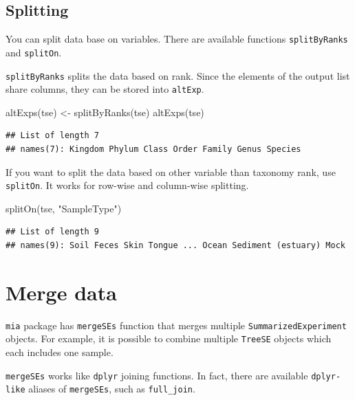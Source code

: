 \documentclass[
]{book}
\newenvironment{Shaded}{\begin{snugshade}}{\end{snugshade}}
\newcommand{\FunctionTok}[1]{\textcolor[rgb]{0.00,0.00,0.00}{#1}}
\newcommand{\NormalTok}[1]{#1}
\newcommand{\OtherTok}[1]{\textcolor[rgb]{0.56,0.35,0.01}{#1}}
\newcommand{\StringTok}[1]{\textcolor[rgb]{0.31,0.60,0.02}{#1}}
\begin{document}
\hypertarget{splitting}{%
\subsection{Splitting}\label{splitting}}

You can split data base on variables. There are available functions \texttt{splitByRanks}
and \texttt{splitOn}.

\texttt{splitByRanks} splits the data based on rank. Since the elements of the output list
share columns, they can be stored into \texttt{altExp}.

\begin{Shaded}
\begin{Highlighting}[]
\FunctionTok{altExps}\NormalTok{(tse) }\OtherTok{\textless{}{-}} \FunctionTok{splitByRanks}\NormalTok{(tse)}
\FunctionTok{altExps}\NormalTok{(tse)}
\end{Highlighting}
\end{Shaded}

\begin{verbatim}
## List of length 7
## names(7): Kingdom Phylum Class Order Family Genus Species
\end{verbatim}

If you want to split the data based on other variable than taxonomy rank, use
\texttt{splitOn}. It works for row-wise and column-wise splitting.

\begin{Shaded}
\begin{Highlighting}[]
\FunctionTok{splitOn}\NormalTok{(tse, }\StringTok{"SampleType"}\NormalTok{)}
\end{Highlighting}
\end{Shaded}

\begin{verbatim}
## List of length 9
## names(9): Soil Feces Skin Tongue ... Ocean Sediment (estuary) Mock
\end{verbatim}

\hypertarget{merge-data}{%
\section{Merge data}\label{merge-data}}

\texttt{mia} package has \texttt{mergeSEs} function that merges multiple \texttt{SummarizedExperiment}
objects. For example, it is possible to combine multiple \texttt{TreeSE} objects which each
includes one sample.

\texttt{mergeSEs} works like \texttt{dplyr} joining functions. In fact, there are available
\texttt{dplyr-like} aliases of \texttt{mergeSEs}, such as \texttt{full\_join}.
\end{document}
